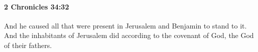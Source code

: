 
		\paragraph{2 Chronicles 34:32} %
			\label{2CHRONICLES-34-32}

			And he caused all that were present in Jerusalem and Benjamin to stand to it. And the inhabitants of Jerusalem did according to the covenant of God, the God of their fathers.


